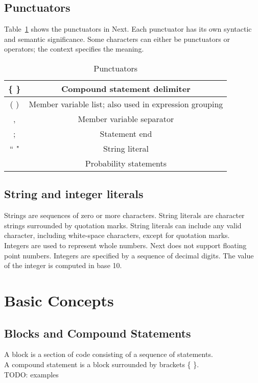 \documentclass[12pt]{article}
\begin{document}
\subsection{Punctuators}
Table~\ref{punctuators} shows the punctuators in Next.  Each punctuator has its own syntactic and semantic significance.  Some characters can either be punctuators or operators; the context specifies the meaning.

\begin{table}[htdp]
\caption{Punctuators}
\begin{center}
\begin{tabular}{|c|c|}
\hline
\{ \} & Compound statement delimiter \\
\hline
( ) & Member variable list; also used in expression grouping \\
\hline
, & Member variable separator \\
\hline
; & Statement end \\
\hline 
`` " & String literal \\
\hline
[? ?] & Probability statements \\ 
\hline
\end{tabular}
\end{center}
\label{punctuators}
\end{table}%

\subsection{String and integer literals}
Strings are sequences of zero or more characters.  String literals are character strings surrounded by quotation marks.  String literals can include any valid character, including white-space characters, except for quotation marks. \\

\noindent Integers are used to represent whole numbers.  Next does not support floating point numbers.  Integers are specified by a sequence of decimal digits.  The value of the integer is computed in base 10.

\section{Basic Concepts}

\subsection{Blocks and Compound Statements}
A block is a section of code consisting of a sequence of statements.  \\ A compound statement is a block surrounded by brackets \{ \}. \\
TODO: examples 
\end{document}
